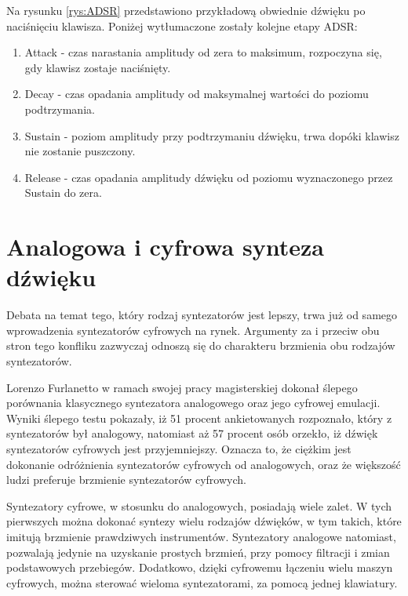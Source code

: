 Na rysunku \ref{rys:ADSR} przedstawiono przykładową obwiednie dźwięku po naciśnięciu klawisza. Poniżej wytłumaczone zostały kolejne etapy ADSR:
\begin{enumerate}
	\item Attack - czas narastania amplitudy od zera to maksimum, rozpoczyna się, gdy klawisz zostaje naciśnięty.
	
	\item Decay - czas opadania amplitudy od maksymalnej wartości do poziomu podtrzymania.
	
	\item Sustain - poziom amplitudy przy podtrzymaniu dźwięku, trwa dopóki klawisz nie zostanie puszczony.
	
	\item Release - czas opadania amplitudy dźwięku od poziomu wyznaczonego przez Sustain do zera.
\end{enumerate}


\section{Analogowa i cyfrowa synteza dźwięku}
Debata na temat tego, który rodzaj syntezatorów jest lepszy, trwa już od samego wprowadzenia syntezatorów cyfrowych na rynek. Argumenty za i przeciw obu stron tego konfliku zazwyczaj odnoszą się do charakteru brzmienia obu rodzajów syntezatorów. 

Lorenzo Furlanetto w ramach swojej pracy magisterskiej dokonał ślepego porównania klasycznego syntezatora analogowego oraz jego cyfrowej emulacji. Wyniki ślepego testu pokazały, iż 51 procent ankietowanych rozpoznało, który z syntezatorów był analogowy, natomiast aż 57 procent osób orzekło, iż dźwięk syntezatorów cyfrowych jest przyjemniejszy. Oznacza to, że ciężkim jest dokonanie odróżnienia syntezatorów cyfrowych od analogowych, oraz że większość ludzi preferuje brzmienie syntezatorów cyfrowych.

Syntezatory cyfrowe, w stosunku do analogowych, posiadają wiele zalet. W tych pierwszych można dokonać syntezy wielu rodzajów dźwięków, w tym takich, które imitują brzmienie prawdziwych instrumentów. Syntezatory analogowe natomiast, pozwalają jedynie na uzyskanie prostych brzmień, przy pomocy filtracji i zmian podstawowych przebiegów. Dodatkowo, dzięki cyfrowemu łączeniu wielu maszyn cyfrowych, można sterować wieloma syntezatorami, za pomocą jednej klawiatury.

